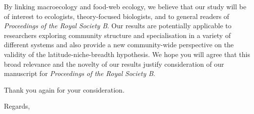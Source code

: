 \documentclass[12pt]{letter}
\newcommand{\myjournal}{\emph{Proceedings of the Royal Society B}}
\begin{document}
\begin{letter}
By linking macroecology and food-web ecology, we believe that our study will
be of interest to ecologists, theory-focused biologists, and to general
readers of \myjournal. Our results are potentially applicable to researchers
exploring community structure and specialisation in a variety of different
systems and also provide a new community-wide perspective on the validity of
the latitude-niche-breadth hypothesis. We hope you will agree that this broad
relevance and the novelty of our results justify consideration of our
manuscript for \myjournal.


Thank you again for your consideration.

\closing{Regards,}


\end{letter}


\end{document}
